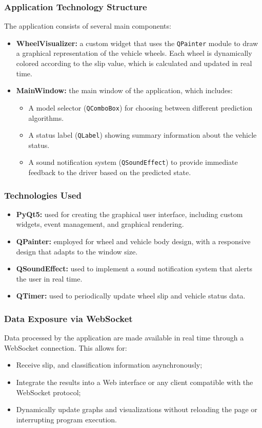 \documentclass[a4paper,final,12pt]{report}
\begin{document}
\subsubsection{Application Technology Structure}
The application consists of several main components:
\begin{itemize}
    \item \textbf{WheelVisualizer:} a custom widget that uses the \texttt{QPainter} module to draw a graphical representation of the vehicle wheels. Each wheel is dynamically colored according to the slip value, which is calculated and updated in real time.
    \item \textbf{MainWindow:} the main window of the application, which includes:
    \begin{itemize}
        \item A model selector (\texttt{QComboBox}) for choosing between different prediction algorithms.
        \item A status label (\texttt{QLabel}) showing summary information about the vehicle status.
        \item A sound notification system (\texttt{QSoundEffect}) to provide immediate feedback to the driver based on the predicted state.
    \end{itemize}
\end{itemize}

\subsubsection{Technologies Used}
\begin{itemize}
    \item \textbf{PyQt5:} used for creating the graphical user interface, including custom widgets, event management, and graphical rendering.
    \item \textbf{QPainter:} employed for wheel and vehicle body design, with a responsive design that adapts to the window size.
    \item \textbf{QSoundEffect:} used to implement a sound notification system that alerts the user in real time.
    \item \textbf{QTimer:} used to periodically update wheel slip and vehicle status data.
\end{itemize}

\subsubsection{Data Exposure via WebSocket}
Data processed by the application are made available in real time through a WebSocket connection.
This allows for:
\begin{itemize}
    \item Receive slip, and classification information asynchronously;
    \item Integrate the results into a Web interface or any client compatible with the WebSocket protocol;
    \item Dynamically update graphs and visualizations without reloading the page or interrupting program execution.
\end{itemize} 
\end{document}
